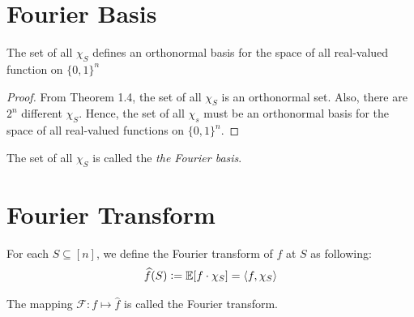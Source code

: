 \section{Fourier Basis}
\begin{theorem}
The set of all $\chi_S$ defines an orthonormal basis for the space of all real-valued function on $\{ 0, 1\}^n$
\end{theorem}

\begin{proof}
From Theorem 1.4, the set of all $\chi_S$ is an orthonormal set. Also, there are $2^n$ different $\chi_S$. Hence, the set of all $\chi_s$ must be an orthonormal basis for the space of all real-valued functions on $\{ 0,1 \}^n$.
\end{proof}
The set of all $\chi_S$ is called the \textit{the Fourier basis}.

\section{Fourier Transform}
\begin{definition} 
For each $S \subseteq [n]$, we define the Fourier transform of $f$ at $S$ as following: 
 $$\widehat{f}(S) \vcentcolon= \mathbb{E}[f \cdot \chi_S] = \langle f, \chi_S \rangle $$
\end{definition}

\begin{definition}
 The mapping $\mathcal{F} : f \mapsto \widehat{f}$ is called the Fourier transform. 
\end{definition}

